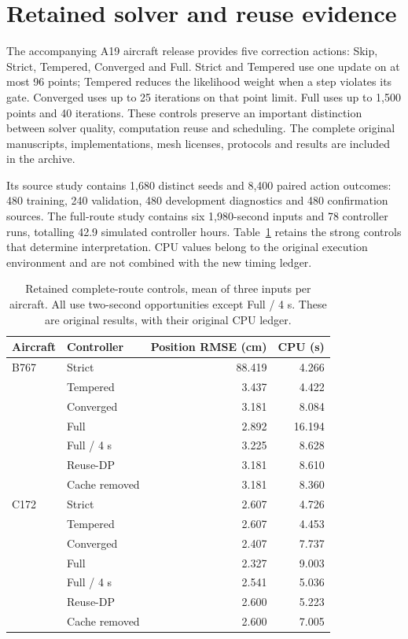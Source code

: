 \section{Retained solver and reuse evidence}\label{app:retained}
The accompanying A19 aircraft release provides five correction actions: Skip, Strict, Tempered, Converged and Full. Strict and Tempered use one update on at most 96 points; Tempered reduces the likelihood weight when a step violates its gate. Converged uses up to 25 iterations on that point limit. Full uses up to 1,500 points and 40 iterations. These controls preserve an important distinction between solver quality, computation reuse and scheduling. The complete original manuscripts, implementations, mesh licenses, protocols and results are included in the archive.

Its source study contains 1,680 distinct seeds and 8,400 paired action outcomes: 480 training, 240 validation, 480 development diagnostics and 480 confirmation sources. The full-route study contains six 1,980-second inputs and 78 controller runs, totalling 42.9 simulated controller hours. Table~\ref{tab:retained} retains the strong controls that determine interpretation. CPU values belong to the original execution environment and are not combined with the new timing ledger.

\begin{table}[t]\centering\small
\caption{Retained complete-route controls, mean of three inputs per aircraft. All use two-second opportunities except Full / 4 s. These are original results, with their original CPU ledger.}\label{tab:retained}
\begin{tabular}{@{}llrr@{}}\toprule
Aircraft & Controller & Position RMSE (cm)& CPU (s)\\\midrule
B767&Strict&88.419&4.266\\
&Tempered&3.437&4.422\\
&Converged&3.181&8.084\\
&Full&2.892&16.194\\
&Full / 4 s&3.225&8.628\\
&Reuse-DP&3.181&8.610\\
&Cache removed&3.181&8.360\\\midrule
C172&Strict&2.607&4.726\\
&Tempered&2.607&4.453\\
&Converged&2.407&7.737\\
&Full&2.327&9.003\\
&Full / 4 s&2.541&5.036\\
&Reuse-DP&2.600&5.223\\
&Cache removed&2.600&7.005\\\bottomrule
\end{tabular}
\end{table}

